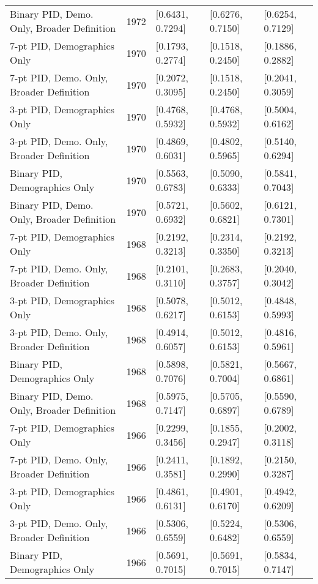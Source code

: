 \begin{longtable}{lrlll}
  Binary PID, Demo. Only, Broader Definition & 1972 & [0.6431, 0.7294] & [0.6276, 0.7150] & [0.6254, 0.7129] \\ 
  7-pt PID, Demographics Only & 1970 & [0.1793, 0.2774] & [0.1518, 0.2450] & [0.1886, 0.2882] \\ 
  7-pt PID, Demo. Only, Broader Definition & 1970 & [0.2072, 0.3095] & [0.1518, 0.2450] & [0.2041, 0.3059] \\ 
  3-pt PID, Demographics Only & 1970 & [0.4768, 0.5932] & [0.4768, 0.5932] & [0.5004, 0.6162] \\ 
  3-pt PID, Demo. Only, Broader Definition & 1970 & [0.4869, 0.6031] & [0.4802, 0.5965] & [0.5140, 0.6294] \\ 
  Binary PID, Demographics Only & 1970 & [0.5563, 0.6783] & [0.5090, 0.6333] & [0.5841, 0.7043] \\ 
  Binary PID, Demo. Only, Broader Definition & 1970 & [0.5721, 0.6932] & [0.5602, 0.6821] & [0.6121, 0.7301] \\ 
  7-pt PID, Demographics Only & 1968 & [0.2192, 0.3213] & [0.2314, 0.3350] & [0.2192, 0.3213] \\ 
  7-pt PID, Demo. Only, Broader Definition & 1968 & [0.2101, 0.3110] & [0.2683, 0.3757] & [0.2040, 0.3042] \\ 
  3-pt PID, Demographics Only & 1968 & [0.5078, 0.6217] & [0.5012, 0.6153] & [0.4848, 0.5993] \\ 
  3-pt PID, Demo. Only, Broader Definition & 1968 & [0.4914, 0.6057] & [0.5012, 0.6153] & [0.4816, 0.5961] \\ 
  Binary PID, Demographics Only & 1968 & [0.5898, 0.7076] & [0.5821, 0.7004] & [0.5667, 0.6861] \\ 
  Binary PID, Demo. Only, Broader Definition & 1968 & [0.5975, 0.7147] & [0.5705, 0.6897] & [0.5590, 0.6789] \\ 
  7-pt PID, Demographics Only & 1966 & [0.2299, 0.3456] & [0.1855, 0.2947] & [0.2002, 0.3118] \\ 
  7-pt PID, Demo. Only, Broader Definition & 1966 & [0.2411, 0.3581] & [0.1892, 0.2990] & [0.2150, 0.3287] \\ 
  3-pt PID, Demographics Only & 1966 & [0.4861, 0.6131] & [0.4901, 0.6170] & [0.4942, 0.6209] \\ 
  3-pt PID, Demo. Only, Broader Definition & 1966 & [0.5306, 0.6559] & [0.5224, 0.6482] & [0.5306, 0.6559] \\ 
  Binary PID, Demographics Only & 1966 & [0.5691, 0.7015] & [0.5691, 0.7015] & [0.5834, 0.7147] \\ 

\end{longtable}
